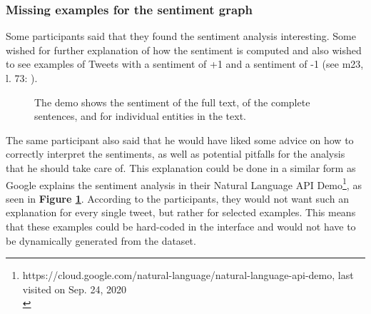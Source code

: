 \subsubsection*{Missing examples for the sentiment graph}\label{sec:missingExamples}
Some participants said that they found the sentiment analysis interesting. Some wished for further explanation of how the sentiment is computed and also wished to see examples of Tweets with a sentiment of +1 and a sentiment of -1 (see m23, l. 73: ).

\begin{figure}[htb!]
    \centering
    \caption{The demo shows the sentiment of the full text, of the complete sentences, and for individual entities in the text.}
    \label{fig:sentiment_google}
\end{figure}

The same participant also said that he would have liked some advice on how to correctly interpret the sentiments, as well as potential pitfalls for the analysis that he should take care of. This explanation could be done in a similar form as Google explains the sentiment analysis in their Natural Language API Demo\footnote{https://cloud.google.com/natural-language/natural-language-api-demo, last visited on Sep. 24, 2020\\}, as seen in \textbf{Figure \ref{fig:sentiment_google}}. According to the participants, they would not want such an explanation for every single tweet, but rather for selected examples. This means that these examples could be hard-coded in the interface and would not have to be dynamically generated from the dataset.

